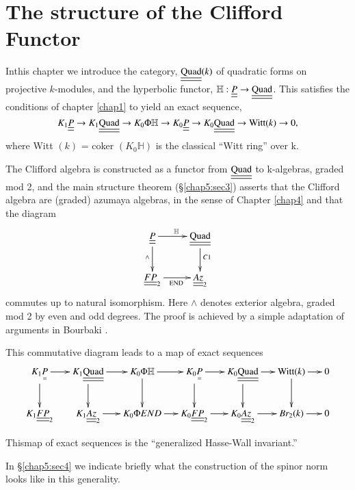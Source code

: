 \chapter{The structure of the Clifford Functor}\label{chap5} %

In\pageoriginale this chapter we introduce the category,
$\underline{\underline{\rm Quad}}(k)$ of quadratic forms on projective
$k$-modules, and the hyperbolic functor,
$\mathbb{H}:\underline{\underline{P}}\to
\underline{\underline{\rm Quad}}$. This satisfies the conditions of
chapter \ref{chap1} to yield an exact sequence, 
$$
K_1 \underline{\underline{P}} \to K_1  \underline{\underline{\rm Quad}}
\to K_0 \Phi \mathbb{H}\to K_0 \underline{\underline{P}}\to K_0
\underline{\underline{\rm Quad}} \to \text{Witt}(k)\to 0, 
$$ 
where Witt $(k)$ = coker $(K_0 \mathbb{H})$ is the classical ``Witt
ring'' over k.  

The Clifford algebra is constructed as a functor from $
\underline{\underline{\rm Quad}}$ to k-algebras, graded mod 2, and the
main structure  theorem (\S \ref{chap5:sec3}) asserts that the
Clifford algebra are 
(graded) azumaya algebras, in the sense of Chapter \ref{chap4} and that the
diagram  
\[
\xymatrix{
\underline{\underline{P}} \ar[r]^{\mathbb{H}}\ar[d]_{\wedge} &
\underline{\underline{\rm Quad}}  \ar[d]^{C1}\\
\underline{\underline{FP}}_2 \ar[r]_{\rm END} &
\underline{\underline{Az}}_2 
}
\]
commutes up to natural isomorphism. Here $\wedge$ denotes exterior
algebra, graded mod 2 by even and odd degrees. The proof is achieved
by a simple adaptation of arguments in Bourbaki \cite{key2}. 

This commutative diagram leads to a map of exact sequences 
{\fontsize{9pt}{11pt}\selectfont
\[
\xymatrix@C=.5cm{
K_1 \underset{=}{P} \ar[r] \ar[d] & K_1 \underline{\underline{\rm
    Quad}} \ar[r] \ar[d] & K_0 \Phi \mathbb{H} \ar[r] \ar[d]& K_0
\underset{=}{P} \ar[r] \ar[d] & K_0 \underline{\underline{\rm Quad}}
\ar[r] \ar[d] & \text{Witt} (k) \ar[r] \ar[d] & 0\\
K_1 \underline{\underline{FP}}_2  & K_1 \underline{\underline{Az}}_2
\ar[r] & K_0 \Phi END \ar[r] & K_0 \underline{\underline{FP}}_2 \ar[r]
& K_0 \underline{\underline{Az}}_2 \ar[r] & Br_2 (k) \ar[r] & 0
}
\]
}\relax

This\pageoriginale map of exact sequences is the ``generalized Hasse-Wall
invariant.''  

In \S \ref{chap5:sec4} we indicate briefly what the construction of the
spinor norm looks like in this generality.   

